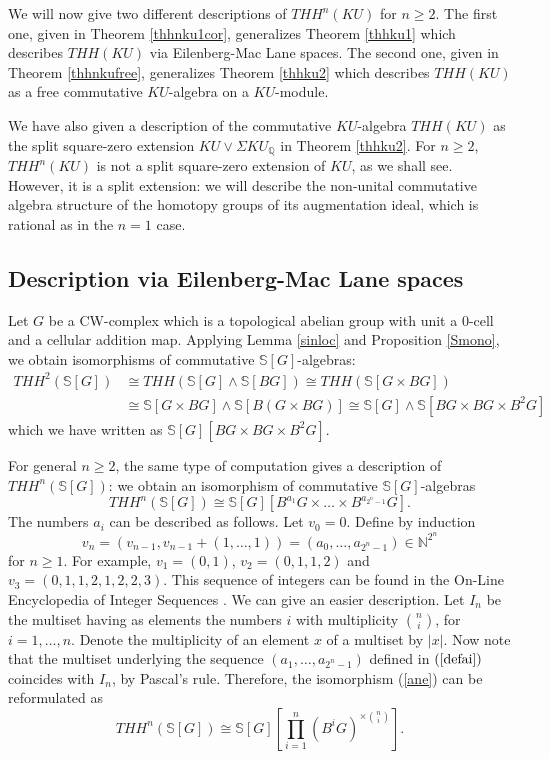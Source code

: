 \documentclass[a4paper,11pt]{amsart} %
\theoremstyle{definition} \newtheorem{defn}[equation]{Definition}
\theoremstyle{remark} \newtheorem{notation}[equation]{Notation}
\theoremstyle{plain} \newtheorem{teo}[equation]{Theorem}
\theoremstyle{plain} \newtheorem{lema}[equation]{Lemma}
\theoremstyle{plain} \newtheorem{prop}[equation]{Proposition}
\theoremstyle{plain} \newtheorem{corolario}[equation]{Corollary}
\theoremstyle{remark} \newtheorem{obs}[equation]{Remark}
\theoremstyle{remark} \newtheorem{sideobs}[equation]{Side remark}
\theoremstyle{remark} \newtheorem{ejercicio}[equation]{Exercise}
\theoremstyle{definition} \newtheorem{notn}[equation]{Notation}
\theoremstyle{remark} \newtheorem{ej}[equation]{Example}
\theoremstyle{remark} \newtheorem{contraej}[equation]{Counterexample}
\theoremstyle{plain} \newtheorem{conj}[equation]{Conjecture}
\renewcommand{\1}{\ensuremath{\mathbbm{1}}}
\newcommand{\Q}{\mathbb{Q}}
\renewcommand{\S}{\mathbb{S}}
\newcommand{\N}{\mathbb{N}}
\numberwithin{equation}{section}
\begin{document}
We will now give two different descriptions of $THH^n(KU)$ for $n\geq 2$. The first one, given in Theorem \ref{thhnku1cor}, generalizes Theorem \ref{thhku1} which describes $THH(KU)$ via Eilenberg-Mac Lane spaces. The second one, given in Theorem \ref{thhnkufree}, generalizes Theorem \ref{thhku2} which describes $THH(KU)$ as a free commutative $KU$-algebra on a $KU$-module.

We have also given a description of the commutative $KU$-algebra $THH(KU)$ as the split square-zero extension $KU \vee \Sigma KU_\Q$ in Theorem \ref{thhku2}. For $n\geq 2$, $THH^n(KU)$ is not a split square-zero extension of $KU$, as we shall see. However, it is a split extension: we will describe the non-unital commutative algebra structure of the homotopy groups of its augmentation ideal, which is rational as in the $n=1$ case.

%

\subsection{Description via Eilenberg-Mac Lane spaces} Let $G$ be a CW-complex which is a topological abelian group with unit a 0-cell and a cellular addition map. Applying Lemma \ref{sinloc} and Proposition \ref{Smono}, we obtain isomorphisms of commutative $\S[G]$-algebras: 
\begin{align*}THH^2(\S[G])& \cong THH(\S[G] \wedge \S[BG]) \cong THH(\S[G\times BG]) \\ & \cong \S[G\times BG] \wedge \S[B(G\times BG)] \cong \S[G] \wedge \S[BG \times BG \times B^2G] \end{align*}
which we have written as $\S[G][BG \times BG \times B^2G]$.

For general $n\geq 2$, the same type of computation gives a description of $THH^n(\S[G])$: we obtain an isomorphism of commutative $\S[G]$-algebras
\begin{equation}\label{ane}THH^n(\S[G]) \cong \S[G][B^{a_1}G\times \dots\times B^{a_{2^n-1}}G].\end{equation} The numbers $a_i$ can be described as follows. Let $v_0=0$. Define by induction \begin{equation}\label{defai} v_n=(v_{n-1},v_{n-1}+(1,\dots,1)) = (a_0, \dots,a_{2^n-1})\in \N^{2^n}\end{equation}
for $n\geq 1$. For example, $v_1=(0,1)$, $v_2=(0,1,1,2)$ and $v_3=(0,1,1,2,1,2,2,3)$. %
This sequence of integers can be found in the On-Line Encyclopedia of Integer Sequences \cite{oeis}. We can give an easier description. Let $I_n$ be the multiset having as elements the numbers $i$ with multiplicity ${n\choose i}$, for $i=1,\dots,n$. Denote the multiplicity of an element $x$ of a multiset by $|x|$. Now note that the multiset underlying the sequence $(a_1,\dots,a_{2^n-1})$ defined in $(\ref{defai})$ coincides with $I_n$, by Pascal's rule. %
Therefore, the isomorphism (\ref{ane}) can be reformulated as
\begin{equation}\label{thhnsg-ref} THH^n(\S[G])\cong \S[G]\left[\prod\limits_{i=1}^n (B^iG)^{\times {n \choose i}}\right].\end{equation} 
\end{document}
